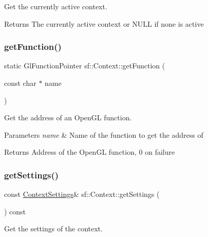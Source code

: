 Get the currently active context. 

\begin{DoxyReturn}{Returns}
The currently active context or N\+U\+LL if none is active 
\end{DoxyReturn}
\mbox{\label{classsf_1_1_context_a998980d311effdf6223ce40d934c23c3}} 
\subsubsection{\texorpdfstring{get\+Function()}{getFunction()}}
{\footnotesize\ttfamily static Gl\+Function\+Pointer sf\+::\+Context\+::get\+Function (\begin{DoxyParamCaption}\item[{const char $\ast$}]{name }\end{DoxyParamCaption})\hspace{0.3cm}{\ttfamily [static]}}



Get the address of an Open\+GL function. 


\begin{DoxyParams}{Parameters}
{\em name} & Name of the function to get the address of\\
\hline
\end{DoxyParams}
\begin{DoxyReturn}{Returns}
Address of the Open\+GL function, 0 on failure 
\end{DoxyReturn}
\mbox{\label{classsf_1_1_context_a2cc81c5466553d1901f660d866b4b48b}} 
\subsubsection{\texorpdfstring{get\+Settings()}{getSettings()}}
{\footnotesize\ttfamily const \hyperlink{structsf_1_1_context_settings}{Context\+Settings}\& sf\+::\+Context\+::get\+Settings (\begin{DoxyParamCaption}{ }\end{DoxyParamCaption}) const}



Get the settings of the context. 

